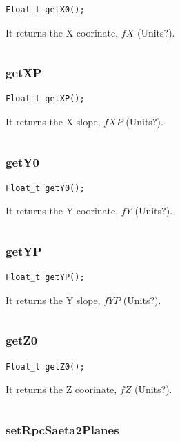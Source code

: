 \documentclass[a4paper]{book}
\begin{document}
\begin{lstlisting}[style=customc]
Float_t getX0();
\end{lstlisting}

It returns the X coorinate, $fX$ (Units?).

\[\]

\subsubsection{getXP}

\begin{lstlisting}[style=customc]
Float_t getXP();
\end{lstlisting}

It returns the X slope, $fXP$ (Units?).

\[\]

\subsubsection{getY0}

\begin{lstlisting}[style=customc]
Float_t getY0();
\end{lstlisting}

It returns the Y coorinate, $fY$ (Units?).

\[\]

\subsubsection{getYP}

\begin{lstlisting}[style=customc]
Float_t getYP();
\end{lstlisting}

It returns the Y slope, $fYP$ (Units?).

\[\]

\subsubsection{getZ0}

\begin{lstlisting}[style=customc]
Float_t getZ0();
\end{lstlisting}

It returns the Z coorinate, $fZ$ (Units?).

\[\]

\subsubsection{setRpcSaeta2Planes}
\end{document}
